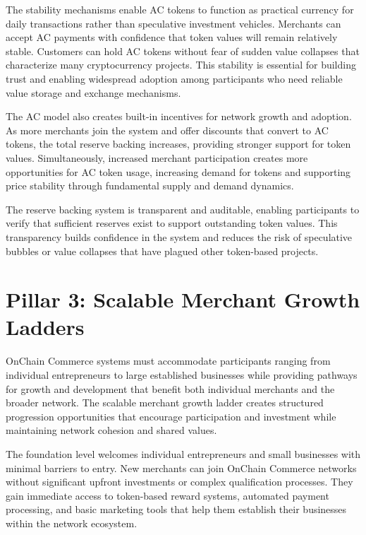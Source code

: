 \documentclass[
  Letterpaper,
]{scrbook}
\begin{document}
The stability mechanisms enable AC tokens to function as practical
currency for daily transactions rather than speculative investment
vehicles. Merchants can accept AC payments with confidence that token
values will remain relatively stable. Customers can hold AC tokens
without fear of sudden value collapses that characterize many
cryptocurrency projects. This stability is essential for building trust
and enabling widespread adoption among participants who need reliable
value storage and exchange mechanisms.

The AC model also creates built-in incentives for network growth and
adoption. As more merchants join the system and offer discounts that
convert to AC tokens, the total reserve backing increases, providing
stronger support for token values. Simultaneously, increased merchant
participation creates more opportunities for AC token usage, increasing
demand for tokens and supporting price stability through fundamental
supply and demand dynamics.

The reserve backing system is transparent and auditable, enabling
participants to verify that sufficient reserves exist to support
outstanding token values. This transparency builds confidence in the
system and reduces the risk of speculative bubbles or value collapses
that have plagued other token-based projects.

\section{Pillar 3: Scalable Merchant Growth
Ladders}\label{pillar-3-scalable-merchant-growth-ladders}

OnChain Commerce systems must accommodate participants ranging from
individual entrepreneurs to large established businesses while providing
pathways for growth and development that benefit both individual
merchants and the broader network. The scalable merchant growth ladder
creates structured progression opportunities that encourage
participation and investment while maintaining network cohesion and
shared values.

The foundation level welcomes individual entrepreneurs and small
businesses with minimal barriers to entry. New merchants can join
OnChain Commerce networks without significant upfront investments or
complex qualification processes. They gain immediate access to
token-based reward systems, automated payment processing, and basic
marketing tools that help them establish their businesses within the
network ecosystem.
\end{document}
